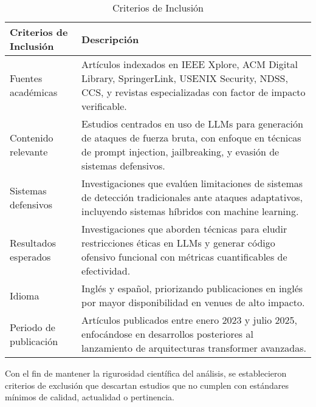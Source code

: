 \begin{table}[h]
\centering
\caption{Criterios de Inclusión}
\label{tab:criterios_inclusion}
\begin{tabular}{|p{4cm}|p{8cm}|}
\hline
\textbf{Criterios de Inclusión} & \textbf{Descripción} \\
\hline
Fuentes académicas & Artículos indexados en IEEE Xplore, ACM Digital Library, SpringerLink, USENIX Security, NDSS, CCS, y revistas especializadas con factor de impacto verificable. \\
\hline
Contenido relevante & Estudios centrados en uso de LLMs para generación de ataques de fuerza bruta, con enfoque en técnicas de prompt injection, jailbreaking, y evasión de sistemas defensivos. \\
\hline
Sistemas defensivos & Investigaciones que evalúen limitaciones de sistemas de detección tradicionales ante ataques adaptativos, incluyendo sistemas híbridos con machine learning. \\
\hline
Resultados esperados & Investigaciones que aborden técnicas para eludir restricciones éticas en LLMs y generar código ofensivo funcional con métricas cuantificables de efectividad. \\
\hline
Idioma & Inglés y español, priorizando publicaciones en inglés por mayor disponibilidad en venues de alto impacto. \\
\hline
Periodo de publicación & Artículos publicados entre enero 2023 y julio 2025, enfocándose en desarrollos posteriores al lanzamiento de arquitecturas transformer avanzadas. \\
\hline
\end{tabular}
\end{table}

Con el fin de mantener la rigurosidad científica del análisis, se establecieron criterios de exclusión que descartan estudios que no cumplen con estándares mínimos de calidad, actualidad o pertinencia.

